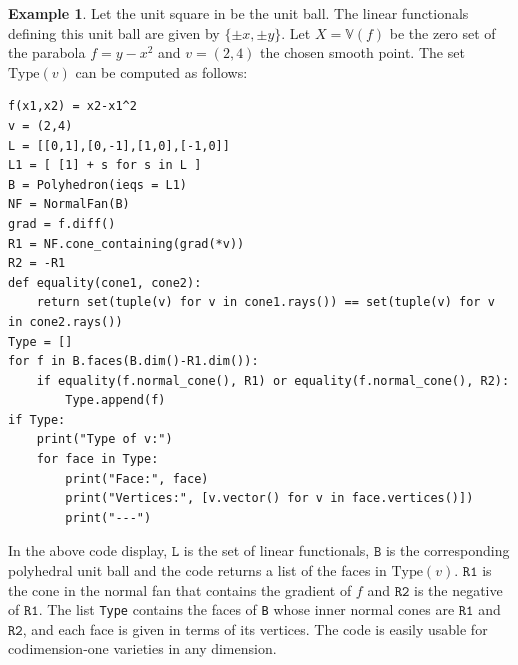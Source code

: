 \documentclass{article}
\numberwithin{theorem}{section}
\theoremstyle{definition}
\newtheorem{example}[theorem]{Example}
\theoremstyle{example_contd}
\newcommand{\type}{\mathrm{Type}}
\newcommand{\V}{{\mathbb{V}}}
\begin{document}
\begin{example}
Let the unit square in  be the unit ball. The linear functionals defining this unit ball are given by $\{\pm x, \pm y\}$. Let $X = \V(f)$ be the zero set of the parabola $f=y-x^2$ and $v=(2,4)$ the chosen smooth point. The set $\type(v)$ can be computed as follows:

 \begin{verbatim}
f(x1,x2) = x2-x1^2 
v = (2,4)
L = [[0,1],[0,-1],[1,0],[-1,0]] 
L1 = [ [1] + s for s in L ]
B = Polyhedron(ieqs = L1)
NF = NormalFan(B)
grad = f.diff()
R1 = NF.cone_containing(grad(*v))
R2 = -R1
def equality(cone1, cone2):
    return set(tuple(v) for v in cone1.rays()) == set(tuple(v) for v in cone2.rays())
Type = []
for f in B.faces(B.dim()-R1.dim()):
    if equality(f.normal_cone(), R1) or equality(f.normal_cone(), R2):
        Type.append(f)
if Type:
    print("Type of v:")
    for face in Type:
        print("Face:", face)
        print("Vertices:", [v.vector() for v in face.vertices()])
        print("---")
\end{verbatim}


In the above code display, $\texttt{L}$ is the set of linear functionals, $\texttt{B}$ is the corresponding polyhedral unit ball and the code returns a list of the faces in $\type(v)$. $\texttt{R1}$ is the cone in the normal fan that contains the gradient of $f$ and $\texttt{R2}$ is the negative of $\texttt{R1}$. 
The list \texttt{Type} contains the faces of \texttt{B} whose inner normal cones are $\texttt{R1}$ and $\texttt{R2}$, and each face is given in terms of its vertices. The code is easily usable for codimension-one varieties in any dimension.

\end{example}
\end{document}
